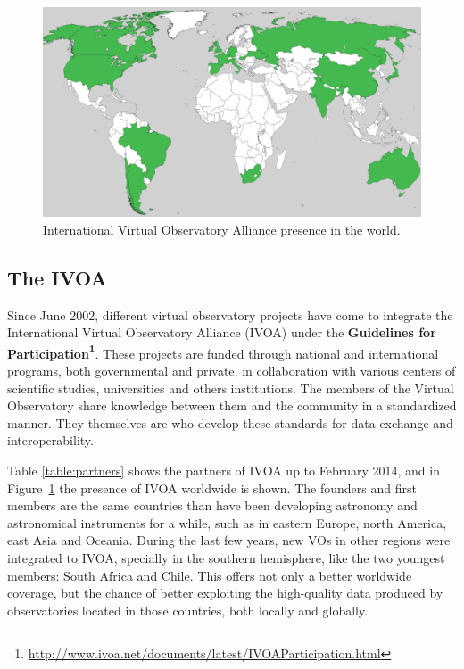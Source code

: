 \normalsize

\begin{figure}%
\begin{center}
	\includegraphics[width=0.9\linewidth]{img/VO-worldwide.png}
	\caption{International Virtual Observatory Alliance presence in the world.}
\end{center}
\label{figure:worldview}
\end{figure}

\subsection{The IVOA}

Since June 2002, different virtual observatory projects have come to integrate the
International Virtual Observatory Alliance (IVOA) under the \textbf{Guidelines
for Participation\footnote{\url{http://www.ivoa.net/documents/latest/IVOAParticipation.html}}}. 
These projects are funded through national and international programs, both governmental and 
private, in collaboration with various centers of scientific studies, universities and
others institutions. The members of the Virtual Observatory share
knowledge between them and the community in a standardized manner. They
themselves are who develop these standards for data exchange and
interoperability.

Table \ref{table:partners} shows the partners of IVOA up to
February 2014, and in Figure~\ref{figure:worldview} the presence of IVOA 
worldwide is shown. The founders and first members are the same countries than have
been developing astronomy and astronomical instruments for a while, such as in eastern
Europe, north America, east Asia and Oceania. During the last few years,
new VOs in other regions were integrated to IVOA, specially in the southern
hemisphere, like the two youngest members: South Africa and Chile. 
This offers not only a better worldwide coverage, but the chance of
better exploiting the high-quality data produced by observatories 
located in those countries, both locally and globally. 

